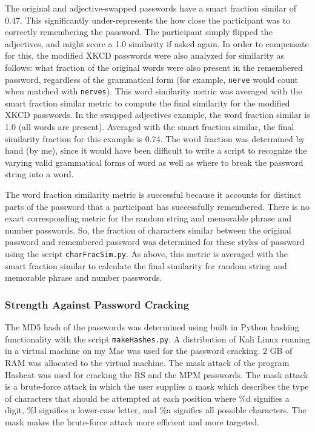 \documentclass{article}
\begin{document}
The original and adjective-swapped passwords have a smart fraction similar of 0.47. This significantly under-represents the how close the participant was to correctly remembering the password. The participant simply flipped the adjectives, and might score a 1.0 similarity if asked again. In order to compensate for this, the modified XKCD passwords were also analyzed for similarity as follows: what fraction of the original words were also present in the remembered password, regardless of the grammatical form (for example, \texttt{nerve} would count when matched with \texttt{nerves}). This word similarity metric was averaged with the smart fraction similar metric to compute the final similarity for the modified XKCD passwords. In the swapped adjectives example, the word fraction similar is 1.0 (all words are present). Averaged with the smart fraction similar, the final similarity fraction for this example is 0.74. The word fraction was determined by hand (by me), since it would have been difficult to write a script to recognize the varying valid grammatical forms of word as well as where to break the password string into a word.

The word fraction similarity metric is successful because it accounts for distinct parts of the password that a participant has successfully remembered. There is no exact corresponding metric for the random string and memorable phrase and number passwords. So, the fraction of characters similar between the original password and remembered password was determined for these styles of password using the script \texttt{charFracSim.py}. As above, this metric is averaged with the smart fraction similar to calculate the final similarity for random string and memorable phrase and number passwords.


\subsubsection*{Strength Against Password Cracking}
The MD5 hash of the passwords was determined using built in Python hashing functionality with the script \texttt{makeHashes.py}. A distribution of Kali Linux running in a virtual machine on my Mac was used for the password cracking. 2 GB of RAM was allocated to the virtual machine. The mask attack of the program Hashcat \cite{hashcat} was used for cracking the RS and the MPM passwords. The mask attack is a brute-force attack in which the user supplies a mask which describes the type of characters that should be attempted at each position where \%d signifies a digit, \%l signifies a lower-case letter, and \%a signifies all possible characters. The mask makes the brute-force attack more efficient and more targeted.
\end{document}
